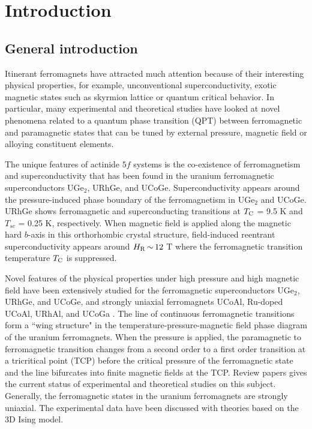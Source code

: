 \documentclass[twocolumn,showpacs,preprintnumbers,amsmath,amssymb]{revtex4}
\begin{document}

\maketitle

\section{Introduction}
\subsection{General introduction}
 Itinerant ferromagnets have attracted much attention because of their interesting physical properties, for example, unconventional superconductivity, exotic magnetic states such as skyrmion lattice or quantum critical behavior\cite{saxena,huxley1,aoki0,huy,robler,yu,smith,grigera,pfleiderer1,niklowitz,brando1}. In particular, many experimental and theoretical studies have looked at  novel phenomena related to a quantum phase transition (QPT) between ferromagnetic and paramagnetic states that can be tuned by external pressure, magnetic field or alloying constituent elements. 
 
 The unique features of actinide $5f$ systems is the co-existence of ferromagnetism and superconductivity that has been found in the uranium ferromagnetic superconductors UGe$_2$, URhGe, and UCoGe\cite{saxena,huxley1,aoki0,huy}. Superconductivity appears around the pressure-induced phase boundary of the ferromagnetism in UGe$_2$ and UCoGe\cite{saxena,huxley1,bastien}. URhGe shows ferromagnetic and superconducting transitions at $T_{\rm C}$ = 9.5 K and $T_{sc}$ = 0.25 K, respectively\cite{aoki0}. When magnetic field is applied along the magnetic hard $b$-axis in this orthorhombic crystal structure, field-induced reentrant superconductivity appears around $H_{\rm R}{\,}{\sim}{\,} 12$ T where the ferromagnetic transition temperature $T_{\rm C}$ is suppressed\cite{levy1,levy2}.
 
 Novel features of the physical properties under high pressure and high magnetic field have been extensively studied for the ferromagnetic superconductors UGe$_2$, URhGe, and UCoGe, and strongly uniaxial ferromagnets UCoAl, Ru-doped UCoAl, URhAl, and UCoGa \cite{taufour,nakamura,slooten,aoki,pospisil1,opletal,shimizu2,misek}. The line of continuous ferromagnetic transitions form a ``wing structure" in the temperature-pressure-magnetic field phase diagram of the uranium ferromagnets. When the pressure is applied, the paramagnetic to ferromagnetic transition changes from a second order to a first order transition at a tricritical point (TCP) before the critical pressure of the ferromagnetic state and the line bifurcates into finite magnetic fields at the TCP. Review papers gives the current status of experimental and theoretical studies on this subject\cite{belitz,brando2}. Generally, the ferromagnetic states in the uranium ferromagnets are strongly uniaxial. The experimental data have been discussed with theories based on the 3D Ising model.   
\end{document}
